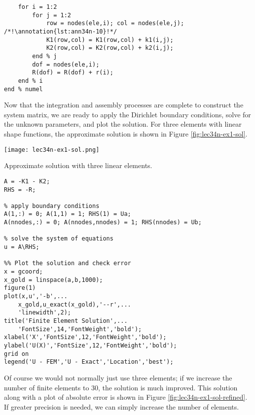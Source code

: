 \begin{lstlisting}[style=myMatlab,name=lec34n-ex1]
    % add local arrays to global arrays ("assembly")
    for i = 1:2
        for j = 1:2
            row = nodes(ele,i); col = nodes(ele,j); /*!\annotation{lst:ann34n-10}!*/
            K1(row,col) = K1(row,col) + k1(i,j);
            K2(row,col) = K2(row,col) + k2(i,j);
        end % j
        dof = nodes(ele,i);
        R(dof) = R(dof) + r(i);
    end % i
end % numel
\end{lstlisting}
Now that the integration and assembly processes are complete to construct the system matrix, we are ready to apply the Dirichlet boundary conditions, solve for the unknown parameters, and plot the solution.  For three elements with linear shape functions, the approximate solution is shown in Figure \ref{fig:lec34n-ex1-sol}.
\begin{marginfigure}
\texttt{[image: lec34n-ex1-sol.png]}
\caption{Approximate solution with three linear elements.}
\label{fig:lec34n-ex1-sol}
\end{marginfigure}
\begin{lstlisting}[style=myMatlab,name=lec34n-ex1]
% Gather into system matrix and vector
A = -K1 - K2;
RHS = -R;

% apply boundary conditions
A(1,:) = 0; A(1,1) = 1; RHS(1) = Ua;
A(nnodes,:) = 0; A(nnodes,nnodes) = 1; RHS(nnodes) = Ub;

% solve the system of equations
u = A\RHS;

%% Plot the solution and check error
x = gcoord;
x_gold = linspace(a,b,1000);
figure(1)
plot(x,u','-b',...
    x_gold,u_exact(x_gold),'--r',...
    'linewidth',2);
title('Finite Element Solution',...
    'FontSize',14,'FontWeight','bold');
xlabel('X','FontSize',12,'FontWeight','bold');
ylabel('U(X)','FontSize',12,'FontWeight','bold');
grid on
legend('U - FEM','U - Exact','Location','best');
\end{lstlisting}

Of course we would not normally just use three elements; if we increase the number of finite elements to 30, the solution is much improved.  This solution along with a plot of absolute error is shown in Figure \ref{fig:lec34n-ex1-sol-refined}.  If greater precision is needed, we can simply increase the number of elements.

